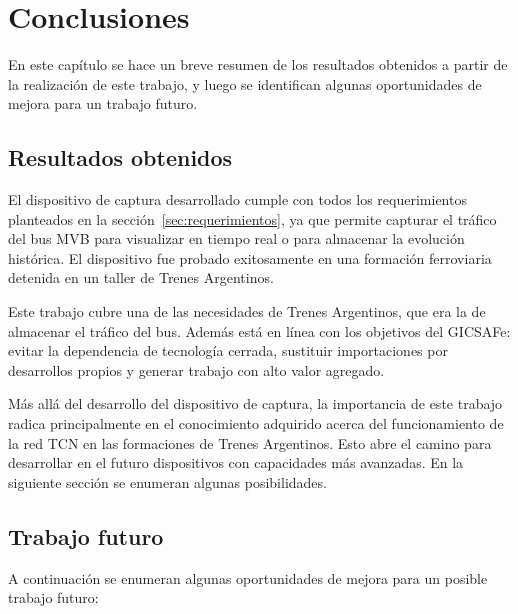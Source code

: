 \chapter{Conclusiones}

\label{cap:Conclusiones}

En este capítulo se hace un breve resumen de los resultados obtenidos a partir de la realización de este trabajo, y luego se identifican algunas oportunidades de mejora para un trabajo futuro.

\section{Resultados obtenidos}

El dispositivo de captura desarrollado cumple con todos los requerimientos planteados en la sección~\ref{sec:requerimientos}, ya que permite capturar el tráfico del bus MVB para visualizar en tiempo real o para almacenar la evolución histórica.
El dispositivo fue probado exitosamente en una formación ferroviaria detenida en un taller de Trenes Argentinos.

Este trabajo cubre una de las necesidades de Trenes Argentinos, que era la de almacenar el tráfico del bus.
Además está en línea con los objetivos del GICSAFe: evitar la dependencia de tecnología cerrada, sustituir importaciones por desarrollos propios y generar trabajo con alto valor agregado.

Más allá del desarrollo del dispositivo de captura, la importancia de este trabajo radica principalmente en el conocimiento adquirido acerca del funcionamiento de la red TCN en las formaciones de Trenes Argentinos.
Esto abre el camino para desarrollar en el futuro dispositivos con capacidades más avanzadas.
En la siguiente sección se enumeran algunas posibilidades.

\section{Trabajo futuro}

A continuación se enumeran algunas oportunidades de mejora para un posible trabajo futuro:

